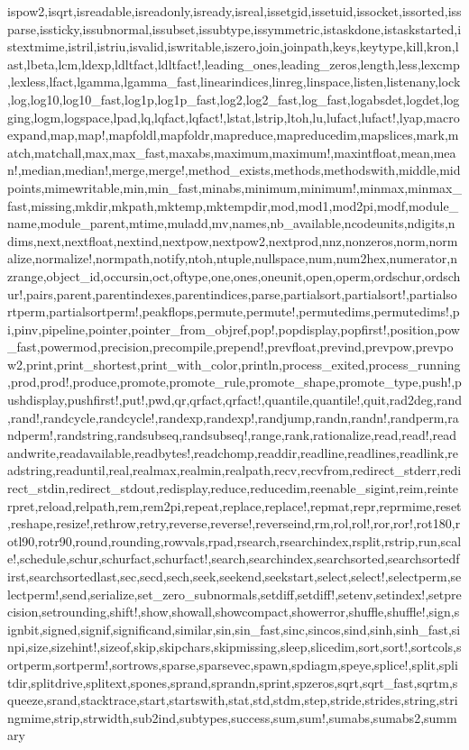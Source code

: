 {ispow2,isqrt,isreadable,isreadonly,isready,isreal,issetgid,issetuid,issocket,issorted,issparse,issticky,issubnormal,issubset,issubtype,issymmetric,istaskdone,istaskstarted,istextmime,istril,istriu,isvalid,iswritable,iszero,join,joinpath,keys,keytype,kill,kron,last,lbeta,lcm,ldexp,ldltfact,ldltfact!,leading_ones,leading_zeros,length,less,lexcmp,lexless,lfact,lgamma,lgamma_fast,linearindices,linreg,linspace,listen,listenany,lock,log,log10,log10_fast,log1p,log1p_fast,log2,log2_fast,log_fast,logabsdet,logdet,logging,logm,logspace,lpad,lq,lqfact,lqfact!,lstat,lstrip,ltoh,lu,lufact,lufact!,lyap,macroexpand,map,map!,mapfoldl,mapfoldr,mapreduce,mapreducedim,mapslices,mark,match,matchall,max,max_fast,maxabs,maximum,maximum!,maxintfloat,mean,mean!,median,median!,merge,merge!,method_exists,methods,methodswith,middle,midpoints,mimewritable,min,min_fast,minabs,minimum,minimum!,minmax,minmax_fast,missing,mkdir,mkpath,mktemp,mktempdir,mod,mod1,mod2pi,modf,module_name,module_parent,mtime,muladd,mv,names,nb_available,ncodeunits,ndigits,ndims,next,nextfloat,nextind,nextpow,nextpow2,nextprod,nnz,nonzeros,norm,normalize,normalize!,normpath,notify,ntoh,ntuple,nullspace,num,num2hex,numerator,nzrange,object_id,occursin,oct,oftype,one,ones,oneunit,open,operm,ordschur,ordschur!,pairs,parent,parentindexes,parentindices,parse,partialsort,partialsort!,partialsortperm,partialsortperm!,peakflops,permute,permute!,permutedims,permutedims!,pi,pinv,pipeline,pointer,pointer_from_objref,pop!,popdisplay,popfirst!,position,pow_fast,powermod,precision,precompile,prepend!,prevfloat,prevind,prevpow,prevpow2,print,print_shortest,print_with_color,println,process_exited,process_running,prod,prod!,produce,promote,promote_rule,promote_shape,promote_type,push!,pushdisplay,pushfirst!,put!,pwd,qr,qrfact,qrfact!,quantile,quantile!,quit,rad2deg,rand,rand!,randcycle,randcycle!,randexp,randexp!,randjump,randn,randn!,randperm,randperm!,randstring,randsubseq,randsubseq!,range,rank,rationalize,read,read!,readandwrite,readavailable,readbytes!,readchomp,readdir,readline,readlines,readlink,readstring,readuntil,real,realmax,realmin,realpath,recv,recvfrom,redirect_stderr,redirect_stdin,redirect_stdout,redisplay,reduce,reducedim,reenable_sigint,reim,reinterpret,reload,relpath,rem,rem2pi,repeat,replace,replace!,repmat,repr,reprmime,reset,reshape,resize!,rethrow,retry,reverse,reverse!,reverseind,rm,rol,rol!,ror,ror!,rot180,rotl90,rotr90,round,rounding,rowvals,rpad,rsearch,rsearchindex,rsplit,rstrip,run,scale!,schedule,schur,schurfact,schurfact!,search,searchindex,searchsorted,searchsortedfirst,searchsortedlast,sec,secd,sech,seek,seekend,seekstart,select,select!,selectperm,selectperm!,send,serialize,set_zero_subnormals,setdiff,setdiff!,setenv,setindex!,setprecision,setrounding,shift!,show,showall,showcompact,showerror,shuffle,shuffle!,sign,signbit,signed,signif,significand,similar,sin,sin_fast,sinc,sincos,sind,sinh,sinh_fast,sinpi,size,sizehint!,sizeof,skip,skipchars,skipmissing,sleep,slicedim,sort,sort!,sortcols,sortperm,sortperm!,sortrows,sparse,sparsevec,spawn,spdiagm,speye,splice!,split,splitdir,splitdrive,splitext,spones,sprand,sprandn,sprint,spzeros,sqrt,sqrt_fast,sqrtm,squeeze,srand,stacktrace,start,startswith,stat,std,stdm,step,stride,strides,string,stringmime,strip,strwidth,sub2ind,subtypes,success,sum,sum!,sumabs,sumabs2,summary}
